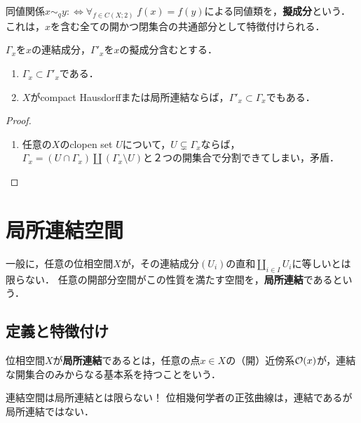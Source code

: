 \documentclass[uplatex,dvipdfmx]{jsreport}
\begin{document}
\begin{definition}
    同値関係$x\sim_qy:\Leftrightarrow \forall_{f\in C(X;2)}\;f(x)=f(y)$による同値類を，\textbf{擬成分}という．
    これは，$x$を含む全ての開かつ閉集合の共通部分として特徴付けられる．
\end{definition}

\begin{lemma}
    $\Gamma_x$を$x$の連結成分，$\Gamma'_x$を$x$の擬成分含むとする．
    \begin{enumerate}
        \item $\Gamma_x\subset\Gamma'_x$である．
        \item $X$がcompact Hausdorffまたは局所連結ならば，$\Gamma'_x\subset\Gamma_x$でもある．
    \end{enumerate}
\end{lemma}
\begin{proof}\mbox{}
    \begin{enumerate}
        \item 任意の$X$のclopen set $U$について，$U\subsetneq\Gamma_x$ならば，$\Gamma_x=(U\cap\Gamma_x)\coprod(\Gamma_x\setminus U)$と２つの開集合で分割できてしまい，矛盾．
    \end{enumerate}
\end{proof}

\section{局所連結空間}

\begin{tcolorbox}[colframe=ForestGreen, colback=ForestGreen!10!white,breakable,colbacktitle=ForestGreen!40!white,coltitle=black,fonttitle=\bfseries\sffamily,
title=]
    一般に，任意の位相空間$X$が，その連結成分$(U_i)$の直和$\coprod_{i\in I}U_i$に等しいとは限らない．
    任意の開部分空間がこの性質を満たす空間を，\textbf{局所連結}であるという．
\end{tcolorbox}

\subsection{定義と特徴付け}

\begin{definition}
    位相空間$X$が\textbf{局所連結}であるとは，任意の点$x\in X$の（開）近傍系$\mathcal{O}(x)$が，連結な開集合のみからなる基本系を持つことをいう．
\end{definition}
\begin{remark}
    連結空間は局所連結とは限らない！
    位相幾何学者の正弦曲線は，連結であるが局所連結ではない．
\end{remark}
\end{document}
